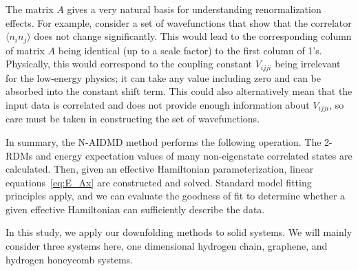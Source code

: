 \documentclass[aps, prb]{revtex4-1}
\begin{document}
The matrix $A$ gives a very natural basis for understanding renormalization effects.
For example, consider a set of wavefunctions that show that the correlator 
$\langle n_i n_j \rangle$ does not change significantly. This would lead to the 
corresponding column of matrix $A$ being identical (up to a scale factor) 
to the first column of 1's. Physically, this would correspond to the coupling constant 
$V_{ijji}$ being irrelevant for the low-energy physics; 
it can take any value including zero 
and can be absorbed into the constant shift term. 
This could also alternatively mean that the input 
data is correlated and does not provide enough information about $V_{ijji}$, so care must be taken in constructing the set of wavefunctions.

In summary, the N-AIDMD method performs the following operation. 
The  2-RDMs and energy expectation values of many non-eigenstate correlated states are calculated.
Then, given an effective Hamiltonian parameterization, linear equations~\eqref{eq:E_Ax} are 
constructed and solved. Standard model fitting principles apply, and we can 
evaluate the goodness of fit to determine whether a given effective Hamiltonian 
can sufficiently describe the data.

In this study, we apply our downfolding methods to solid systems. We will mainly consider three systems here, one dimensional hydrogen chain, graphene, and hydrogen honeycomb systems. 
\end{document}
